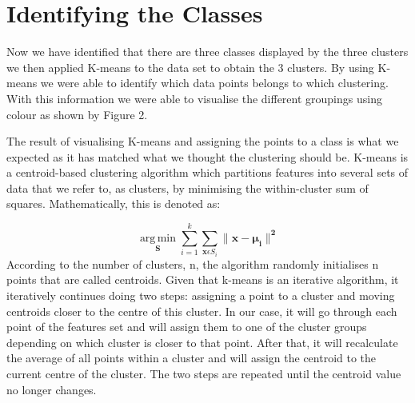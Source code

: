 \documentclass[a4paper, 11pt]{article}
\begin{document}
\section*{\vspace{-0.35cm}Identifying the Classes}
Now we have identified that there are three classes displayed by the three clusters we then applied K-means to the data set to obtain the 3 clusters. By using K-means we were able to identify which data points belongs to which clustering. With this information we were able to visualise the different groupings using colour as shown by Figure 2.

\captionsetup[subfigure]{labelformat=empty}
\begin{figure}[h!]
    \centering
\end{figure}

The result of visualising K-means and assigning the points to a class is what we expected as it has matched what we thought the clustering should be. K-means is a centroid-based clustering algorithm which partitions features into several sets of data that we refer to, as clusters, by minimising the within-cluster sum of squares. Mathematically, this is denoted as:


\begin{equation*}
  \boldsymbol{\operatorname*{arg\,min}_S} \sum_{i=1}^{k}\sum_{\boldsymbol{x} \epsilon S_i}  \boldsymbol{\parallel x - \mu_{i} \parallel^{2}}
\end{equation*}
According to the number of clusters, n, the algorithm randomly initialises n points that are called centroids. Given that k-means is an iterative algorithm, it iteratively continues doing two steps: assigning a point to a cluster and moving centroids closer to the centre of this cluster. In our case, it will go through each point of the features set and will assign them to one of the cluster groups depending on which cluster is closer to that point. After that, it will recalculate the average of all points within a cluster and will assign the centroid to the current centre of the cluster. The two steps are repeated until the centroid value no longer changes.
\end{document}
